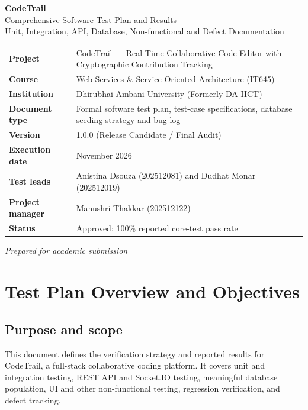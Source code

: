 \documentclass[11pt,a4paper]{article}
\begin{document}
\begin{titlepage}
\begin{center}
    {\LARGE\bfseries CodeTrail}\\[5pt]
    {\Large Comprehensive Software Test Plan and Results}\\[16pt]
    {\large Unit, Integration, API, Database, Non-functional and Defect Documentation}
\end{center}
\vfill
\begin{tabularx}{\textwidth}{>{\bfseries}p{} Y}
Project & CodeTrail --- Real-Time Collaborative Code Editor with Cryptographic Contribution Tracking\\
Course & Web Services \& Service-Oriented Architecture (IT645)\\
Institution & Dhirubhai Ambani University (Formerly DA-IICT)\\
Document type & Formal software test plan, test-case specifications, database seeding strategy and bug log\\
Version & 1.0.0 (Release Candidate / Final Audit)\\
Execution date & November 2026\\
Test leads & Anistina Dsouza (202512081) and Dudhat Monar (202512019)\\
Project manager & Manushri Thakkar (202512122)\\
Status & Approved; 100\% reported core-test pass rate\\
\end{tabularx}
\vfill
\begin{center}
\textit{Prepared for academic submission}
\end{center}
\end{titlepage}

\tableofcontents
\clearpage

\section{Test Plan Overview and Objectives}

\subsection{Purpose and scope}
This document defines the verification strategy and reported results for CodeTrail, a
full-stack collaborative coding platform. It covers unit and integration testing,
REST API and Socket.IO testing, meaningful database population, UI and other
non-functional testing, regression verification, and defect tracking.
\end{document}
